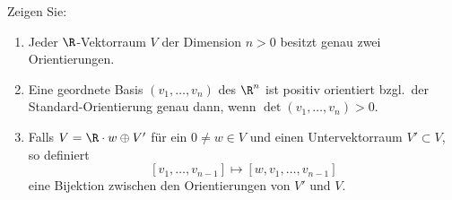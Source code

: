                         \begin{prob}[Orientalisch]
Zeigen Sie:
\begin{enumerate}[label = (\alph*)]
	\item Jeder $\R$-Vektorraum $V$ der Dimension $n>0$ besitzt genau zwei
	Orientierungen.
	\item Eine geordnete Basis $(v_1,\dots,v_n)$ des $\R^n$ ist positiv
	orientiert bzgl.~der Standard-Orientierung genau dann, wenn
	$\det(v_1,\dots,v_n)>0$.
	\item Falls $V=\R\cdot w\oplus V'$ f\"ur ein $0\neq w\in V$ und einen
	Untervektorraum $V'\subset V$, so definiert
	$$
	[v_1,\dots,v_{n-1}]\mapsto [w,v_1,\dots,v_{n-1}]
	$$
	eine Bijektion zwischen den Orientierungen von $V'$ und $V$.
\end{enumerate}

\end{prob}
